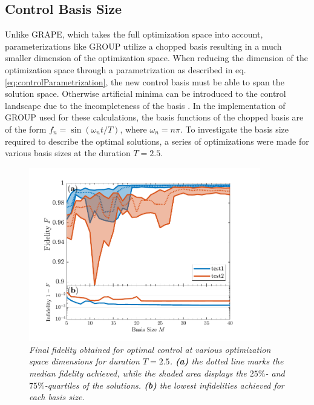 \subsection{Control Basis Size}
Unlike GRAPE, which takes the full optimization space into account, parameterizations like GROUP utilize a chopped basis resulting in a much smaller dimension of the optimization space. When reducing the dimension of the optimization space through a parametrization as described in eq. \eqref{eq:controlParametrization}, the new control basis must be able to span the solution space. Otherwise artificial minima can be introduced to the control landscape due to the incompleteness of the basis \cite{Rach2015}. 
In the implementation of GROUP used for these calculations, the basis functions of the chopped basis are of the form $f_n = \sin \left( \omega_n t / T \right)$, where $\omega_n = n \pi$.
To investigate the basis size required to describe the optimal solutions, a series of optimizations were made for various basis sizes at the duration $T = 2.5$. 
\begin{figure}[h!]
    \centering
    \includegraphics[width=0.9\textwidth]{Figures/L5/FidelityBasisSize.pdf}
    \caption{\textit{Final fidelity obtained for optimal control at various optimization space dimensions for duration $T = 2.5$. \textbf{(a)} the dotted line marks the median fidelity achieved, while the shaded area displays the $25\%$- and $75\%$-quartiles of the solutions. \textbf{(b)} the lowest infidelities achieved for each basis size.}}
    \label{fig:FidelityBasisSize5}
\end{figure}
